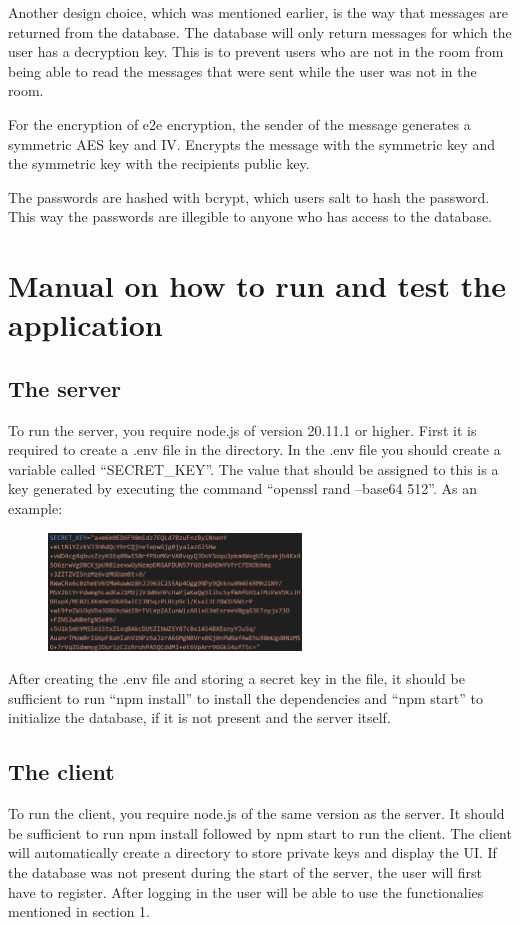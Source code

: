 \documentclass[a4paper]{article}
\begin{document}
Another design choice, which was mentioned earlier, is the way that messages are returned from the database. The database will only return messages for which the user has a decryption key. This is to prevent users who are not in the room from being able to read the messages that were sent while the user was not in the room.

For the encryption of e2e encryption, the sender of the message generates a symmetric AES key and IV. Encrypts the message with the symmetric key and the symmetric key with the recipients public key.

The passwords are hashed with bcrypt, which users salt to hash the password. This way the passwords are illegible to anyone who has access to the database.
\section{Manual on how to run and test the application}
\subsection{The server}
To run the server, you require node.js of version 20.11.1 or higher. First it is required to create a .env file in the directory. In the .env file you should create a variable called \enquote{SECRET\_KEY}. The value that should be assigned to this is a key generated by executing the command \enquote{openssl rand --base64 512}. As an example:
\begin{figure}[H]
    \centering
    \includegraphics[width=0.6\textwidth]{openssl.png}
\end{figure}
After creating the .env file and storing a secret key in the file, it should be sufficient to run \enquote{npm install} to install the dependencies and \enquote{npm start} to initialize the database, if it is not present and the server itself.
\subsection{The client}
To run the client, you require node.js of the same version as the server. It should be sufficient to run npm install followed by npm start to run the client. The client will automatically create a directory to store private keys and display the UI.
If the database was not present during the start of the server, the user will first have to register. After logging in the user will be able to use the functionalies mentioned in section 1.
\end{document}
